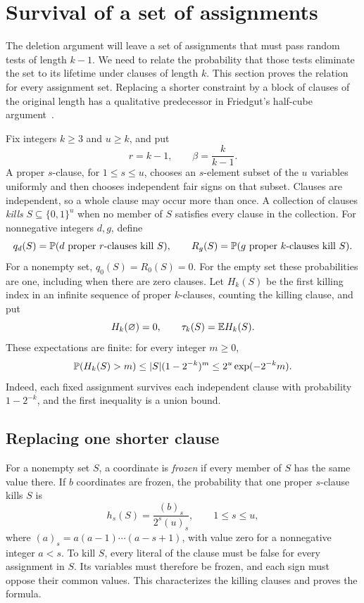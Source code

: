\section{Survival of a set of assignments}
\label{sec:replacement}

The deletion argument will leave a set of assignments that must pass
random tests of length \(k-1\).  We need to relate the probability that
those tests eliminate the set to its lifetime under clauses of length
\(k\).  This section proves the relation for every assignment set.
Replacing a shorter constraint by a block of clauses of the original
length has a qualitative predecessor in Friedgut's half-cube
argument~\cite[Lemma~5.7]{Friedgut}.

Fix integers \(k\ge3\) and \(u\ge k\), and put
\[
 r=k-1,\qquad \beta=\frac{k}{k-1}.
\]
A proper \(s\)-clause, for \(1\le s\le u\), chooses an \(s\)-element
subset of the \(u\) variables uniformly and then chooses independent
fair signs on that subset.  Clauses
are independent, so a whole clause may occur more than once.  A
collection of clauses \emph{kills} \(S\subseteq\{0,1\}^u\) when no
member of \(S\) satisfies every clause in the collection.  For
nonnegative integers \(d,g\), define
\[
 q_d(S)=\mathbb P(\text{\(d\) proper \(r\)-clauses kill \(S\)}),
 \qquad
 R_g(S)=\mathbb P(\text{\(g\) proper \(k\)-clauses kill \(S\)}).
\]
For a nonempty set, \(q_0(S)=R_0(S)=0\).  For the empty set these
probabilities are one, including when there are zero clauses.
Let \(H_k(S)\) be the first killing index in an infinite sequence of
proper \(k\)-clauses, counting the killing clause, and put
\[
 H_k(\varnothing)=0,\qquad \tau_k(S)=\mathbb E H_k(S).
\]
These expectations are finite: for every integer \(m\ge0\),
\begin{equation}\label{eq:set-survival}
 \mathbb P(H_k(S)>m)
 \le |S|(1-2^{-k})^m
 \le 2^u\exp(-2^{-k}m).
\end{equation}
Indeed, each fixed assignment survives each independent clause with
probability \(1-2^{-k}\), and the first inequality is a union bound.

\subsection{Replacing one shorter clause}

For a nonempty set \(S\), a coordinate is \emph{frozen} if every member
of \(S\) has the same value there.  If \(b\) coordinates are frozen,
the probability that one proper \(s\)-clause kills \(S\) is
\begin{equation}\label{eq:frozen-killing}
 h_s(S)=\frac{(b)_s}{2^s(u)_s},\qquad 1\le s\le u,
\end{equation}
where \((a)_s=a(a-1)\cdots(a-s+1)\), with value zero for a nonnegative
integer \(a<s\).  To kill \(S\), every literal of the clause must be
false for every assignment in \(S\).  Its variables must therefore
be frozen, and each sign must oppose their common values.  This
characterizes the killing clauses and proves the formula.


